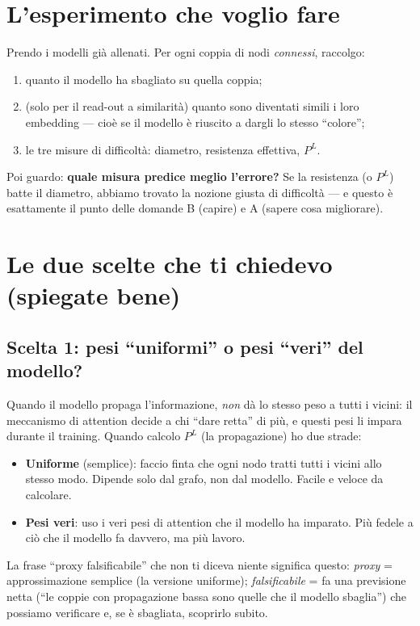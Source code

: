 \documentclass[11pt,a4paper]{article}
\begin{document}
\section{L'esperimento che voglio fare}

Prendo i modelli già allenati. Per ogni coppia di nodi \emph{connessi}, raccolgo:
\begin{enumerate}
  \item quanto il modello ha sbagliato su quella coppia;
  \item (solo per il read-out a similarità) quanto sono diventati simili i loro
        embedding --- cioè se il modello è riuscito a dargli lo stesso ``colore'';
  \item le tre misure di difficoltà: diametro, resistenza effettiva, $P^L$.
\end{enumerate}

Poi guardo: \textbf{quale misura predice meglio l'errore?} Se la resistenza (o
$P^L$) batte il diametro, abbiamo trovato la nozione giusta di difficoltà --- e
questo è esattamente il punto delle domande B (capire) e A (sapere cosa migliorare).

\section{Le due scelte che ti chiedevo (spiegate bene)}

\subsection*{Scelta 1: pesi ``uniformi'' o pesi ``veri'' del modello?}

Quando il modello propaga l'informazione, \emph{non} dà lo stesso peso a tutti i
vicini: il meccanismo di attention decide a chi ``dare retta'' di più, e questi
pesi li impara durante il training. Quando calcolo $P^L$ (la propagazione) ho due
strade:
\begin{itemize}
  \item \textbf{Uniforme} (semplice): faccio finta che ogni nodo tratti tutti i
        vicini allo stesso modo. Dipende solo dal grafo, non dal modello. Facile
        e veloce da calcolare.
  \item \textbf{Pesi veri}: uso i veri pesi di attention che il modello ha
        imparato. Più fedele a ciò che il modello fa davvero, ma più lavoro.
\end{itemize}

La frase ``proxy falsificabile'' che non ti diceva niente significa questo:
\emph{proxy} = approssimazione semplice (la versione uniforme); \emph{falsificabile}
= fa una previsione netta (``le coppie con propagazione bassa sono quelle che il
modello sbaglia'') che possiamo verificare e, se è sbagliata, scoprirlo subito.
\end{document}
